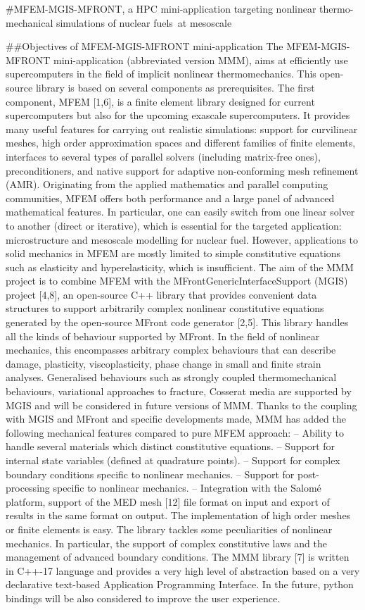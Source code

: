 #MFEM-MGIS-MFRONT, a HPC mini-application targeting nonlinear thermo-mechanical simulations of nuclear fuels at mesoscale



##Objectives of MFEM-MGIS-MFRONT mini-application
The MFEM-MGIS-MFRONT mini-application (abbreviated version MMM), aims at efficiently use supercomputers in the field of implicit nonlinear thermomechanics. This open-source library is based on several components as prerequisites. The first component, MFEM [1,6], is a finite element library designed for current supercomputers but also for the upcoming exascale supercomputers. It provides many useful features for carrying out realistic simulations: support for curvilinear meshes, high order approximation spaces and different families of finite elements, interfaces to several types of parallel solvers (including matrix-free ones), preconditioners, and native support for adaptive non-conforming mesh refinement (AMR). 
Originating from the applied mathematics and parallel computing communities, MFEM offers both performance and a large panel of advanced mathematical features. In particular, one can easily switch from one linear solver to another (direct or iterative), which is essential for the targeted application: microstructure and mesoscale modelling for nuclear fuel. However, applications to solid mechanics in MFEM are mostly limited to simple constitutive equations such as elasticity and hyperelasticity, which is insufficient. 
The aim of the MMM project is to combine MFEM with the MFrontGenericInterfaceSupport (MGIS) project [4,8], an open-source C++ library that provides convenient data structures to support arbitrarily complex nonlinear constitutive equations generated by the open-source MFront code generator [2,5]. This library handles all the kinds of behaviour supported by MFront. In the field of nonlinear mechanics, this encompasses arbitrary complex behaviours that can describe damage, plasticity, viscoplasticity, phase change in small and finite strain analyses. Generalised behaviours such as strongly coupled thermomechanical behaviours, variational approaches to fracture, Cosserat media are supported by MGIS and will be considered in future versions of MMM.
Thanks to the coupling with MGIS and MFront and specific developments made, MMM has added the following mechanical features compared to pure MFEM approach:
– Ability to handle several materials which distinct constitutive equations.
– Support for internal state variables (defined at quadrature points).
– Support for complex boundary conditions specific to nonlinear mechanics.
– Support for post-processing specific to nonlinear mechanics.
– Integration with the Salomé platform, support of the MED mesh [12] file format on input and export of results in the same format on output. 
The implementation of high order meshes or finite elements is easy. The library tackles some peculiarities of nonlinear mechanics. In particular, the support of complex constitutive laws and the management of advanced boundary conditions. 
The MMM library [7] is written in C++-17 language and provides a very high level of abstraction based on a very declarative text-based Application Programming Interface. In the future, python bindings will be also considered to improve the user experience.

